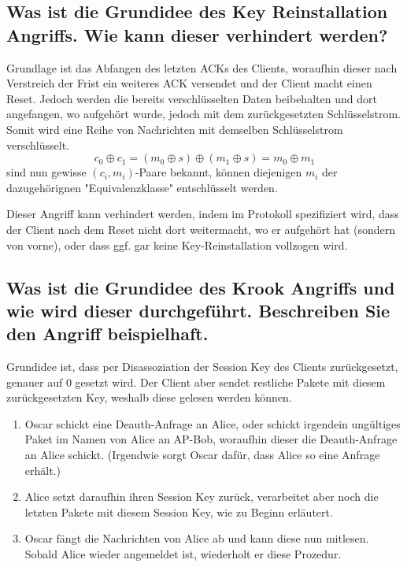 \subsection{Was ist die Grundidee des Key Reinstallation Angriffs. Wie kann dieser verhindert werden?}
Grundlage ist das Abfangen des letzten ACKs des Clients, woraufhin dieser nach Verstreich der Frist ein weiteres ACK versendet und der Client macht einen Reset. Jedoch werden die bereits verschlüsselten Daten beibehalten und dort angefangen, wo aufgehört wurde, jedoch mit dem zurückgesetzten Schlüsselstrom. Somit wird eine Reihe von Nachrichten mit demselben Schlüsselstrom verschlüsselt.
$$
c_0 \oplus c_1 = (m_0 \oplus s) \oplus (m_1 \oplus s) = m_0 \oplus m_1
$$
sind nun gewisse $(c_i,m_i)$-Paare bekannt, können diejenigen $m_i$ der dazugehörignen "Equivalenzklasse" entschlüsselt werden. 

Dieser Angriff kann verhindert werden, indem im Protokoll spezifiziert wird, dass der Client nach dem Reset nicht dort weitermacht, wo er aufgehört hat (sondern von vorne), oder dass ggf. gar keine Key-Reinstallation vollzogen wird.

\subsection{Was ist die Grundidee des Krook Angriffs und wie wird dieser durchgeführt. Beschreiben Sie den Angriff beispielhaft.} 
Grundidee ist, dass per Disassoziation der Session Key des Clients zurückgesetzt, genauer auf $0$ gesetzt wird. Der Client aber sendet restliche Pakete mit diesem zurückgesetzten Key, weshalb diese gelesen werden können.
\begin{enumerate}
    \item Oscar schickt eine Deauth-Anfrage an Alice, oder schickt irgendein ungültiges Paket im Namen von Alice an AP-Bob, woraufhin dieser die Deauth-Anfrage an Alice schickt. (Irgendwie sorgt Oscar dafür, dass Alice so eine Anfrage erhält.)
    \item Alice setzt daraufhin ihren Session Key zurück, verarbeitet aber noch die letzten Pakete mit diesem Session Key, wie zu Beginn erläutert.
    \item Oscar fängt die Nachrichten von Alice ab und kann diese nun mitlesen. Sobald Alice wieder angemeldet ist, wiederholt er diese Prozedur.
\end{enumerate}